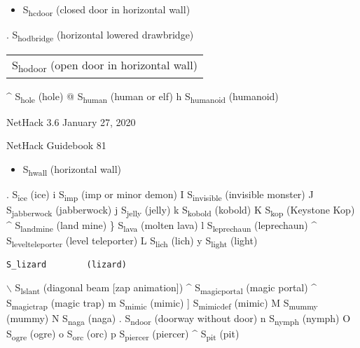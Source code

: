 \documentclass[11pt]{article}
\begin{document}
\begin{itemize}
\item S\textsubscript{hcdoor}        (closed door in horizontal wall)
\end{itemize}
. S\textsubscript{hodbridge}      (horizontal lowered drawbridge)
\begin{center}
\begin{tabular}{l}
S\textsubscript{hodoor}        (open door in horizontal wall)\\
\end{tabular}
\end{center}
\^{} S\textsubscript{hole}         (hole)
@ S\textsubscript{human}        (human or elf)
h S\textsubscript{humanoid}       (humanoid)



NetHack 3.6                   January 27, 2020





NetHack Guidebook                       81



\begin{itemize}
\item S\textsubscript{hwall}        (horizontal wall)
\end{itemize}
. S\textsubscript{ice}         (ice)
i S\textsubscript{imp}         (imp or minor demon)
I S\textsubscript{invisible}      (invisible monster)
J S\textsubscript{jabberwock}      (jabberwock)
j S\textsubscript{jelly}        (jelly)
k S\textsubscript{kobold}        (kobold)
K S\textsubscript{kop}         (Keystone Kop)
\^{} S\textsubscript{land}\textsubscript{mine}      (land mine)
\} S\textsubscript{lava}         (molten lava)
l S\textsubscript{leprechaun}      (leprechaun)
\^{} S\textsubscript{level}\textsubscript{teleporter}   (level teleporter)
L S\textsubscript{lich}         (lich)
y S\textsubscript{light}        (light)

\begin{verbatim}
S_lizard        (lizard)
\end{verbatim}

$\backslash$ S\textsubscript{lslant}        (diagonal beam [zap animation])
\^{} S\textsubscript{magic}\textsubscript{portal}     (magic portal)
\^{} S\textsubscript{magic}\textsubscript{trap}      (magic trap)
m S\textsubscript{mimic}        (mimic)
] S\textsubscript{mimic}\textsubscript{def}      (mimic)
M S\textsubscript{mummy}        (mummy)
N S\textsubscript{naga}         (naga)
. S\textsubscript{ndoor}        (doorway without door)
n S\textsubscript{nymph}        (nymph)
O S\textsubscript{ogre}         (ogre)
o S\textsubscript{orc}         (orc)
p S\textsubscript{piercer}       (piercer)
\^{} S\textsubscript{pit}         (pit)
\end{document}
